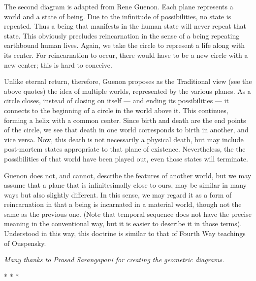 The second diagram is adapted from Rene Guenon. Each plane represents a world and a state of being. Due to the infinitude of possibilities, no state is repeated. Thus a being that manifests in the human state will never repeat that state. This obviously precludes reincarnation in the sense of a being repeating earthbound human lives. Again, we take the circle to represent a life along with its center. For reincarnation to occur, there would have to be a new circle with a new center; this is hard to conceive.

Unlike eternal return, therefore, Guenon proposes as the Traditional view (see the above quotes) the idea of multiple worlds, represented by the various planes. As a circle closes, instead of closing on itself --- and ending its possibilities --- it connects to the beginning of a circle in the world above it. This continues, forming a helix with a common center. Since birth and death are the end points of the circle, we see that death in one world corresponds to birth in another, and vice versa. Now, this death is not necessarily a physical death, but may include post-mortem states appropriate to that plane of existence. Nevertheless, the the possibilities of that world have been played out, even those states will terminate.

Guenon does not, and cannot, describe the features of another world, but we may assume that a plane that is infinitesimally close to ours, may be similar in many ways but also slightly different. In this sense, we may regard it as a form of reincarnation in that a being is incarnated in a material world, though not the same as the previous one. (Note that temporal sequence does not have the precise meaning in the conventional way, but it is easier to describe it in those terms). Understood in this way, this doctrine is similar to that of Fourth Way teachings of Ouspensky.

\textit{Many thanks to Prasad Sarangapani for creating the geometric diagrams.}



\begin{center}* * *\end{center}

